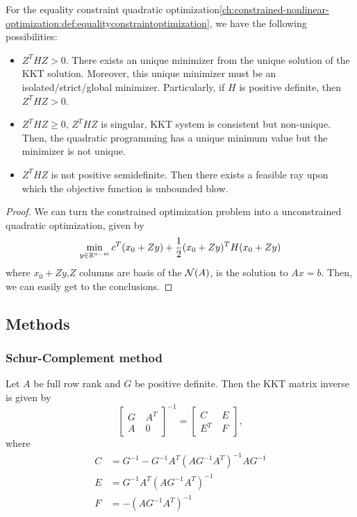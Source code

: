 \begin{refsection}
\begin{theorem}\label{ch:constrained-nonlinear-optimization:th:SufficiencyKKTconditionEqualityConstraintQuadraticProgramming}\cite[lec 7]{Robinson2015nonlinear2}\hfill
For the equality constraint quadratic optimization\autoref{ch:constrained-nonlinear-optimization:def:equalityconstraintoptimization}, we have the following possibilities: 
\begin{itemize}
	\item $Z^THZ > 0$. There exists an unique minimizer from the unique solution of the KKT solution. Moreover, this unique minimizer must be an isolated/strict/global minimizer. Particularly, if $H$ is positive definite, then $Z^THZ > 0$.
	\item $Z^THZ \geq 0$, $Z^THZ$ is singular, KKT system is consistent but non-unique. Then, the quadratic programming has a unique minimum value but the minimizer is not unique. 
	\item $Z^THZ$ is not positive semidefinite. Then there exists a feasible ray upon which the objective function is unbounded blow.
\end{itemize}
\end{theorem}
\begin{proof}
We can turn the constrained optimization problem into a unconstrained quadratic optimization, given by
$$\min_{y\in \mathbb{R}^{n-m}} c^T(x_0 + Zy) + \frac{1}{2}(x_0 + Zy)^TH(x_0 + Zy)$$
where $x_0 + Zy$,$Z$ columns are basis of the $\mathcal{N}(A)$, is the solution to $Ax = b$. Then, we can easily get to the conclusions.
\end{proof}


\subsection{Methods}
\subsubsection{Schur-Complement method}

\begin{lemma}\label{ch:constrained-nonlinear-optimization:th:Schur-complementMethodKKTMatrix}\cite[456]{nocedal2006numerical}
Let $A$ be full row rank and $G$ be positive definite. Then the KKT matrix inverse is given by
$$\begin{bmatrix}
G &~ A^T\\
A &~ 0
\end{bmatrix}^{-1} = \begin{bmatrix}
C &~ E\\
E^T &~ F
\end{bmatrix},$$
where 
\begin{align*}
C &= G^{-1} - G^{-1}A^T(AG^{-1}A^T)^{-1}AG^{-1}\\
E &= G^{-1}A^T(AG^{-1}A^T)^{-1}\\
F &= -(AG^{-1}A^T)^{-1}\\
\end{align*}
\end{lemma}



\end{refsection}
